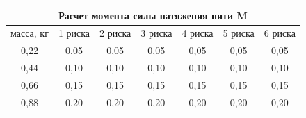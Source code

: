 \documentclass[12pt]{article}
\begin{document}
\begin{enumerate}[label=\arabic*)]
            \begin{table}[H]
                \centering
                        \begin{tabular}{|c|c|c|c|c|c|c|}
                        \hline
                        \multicolumn{7}{|c|}{Расчет момента силы натяжения нити M}\\
                        \hline
                        масса, кг & 1 риска & 2 риска & 3 риска & 4 риска & 5 риска & 6 риска\\
                        \hline
                        0,22 & 0,05&	0,05&	0,05	&0,05	&0,05&	0,05\\
                        \hline
                        0,44 & 0,10	&0,10	&0,10&	0,10&	0,10	&0,10\\
                        \hline
                        0,66 & 0,15&	0,15&	0,15&	0,15&	0,15	&0,15\\
                        \hline
                        0,88 & 0,20&	0,20&0,20	&0,20&	0,20	&0,20\\
                        \hline
                        \end{tabular}
            \end{table}
            

\end{enumerate}
\end{document}
